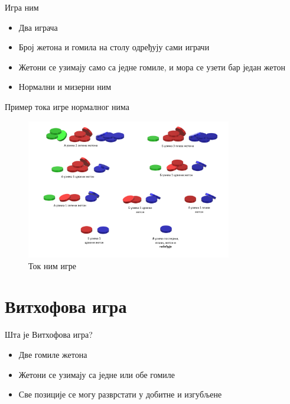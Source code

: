 \documentclass[10pt]{beamer}
\begin{document}
	\begin{frame}{Игра ним}
		\begin{itemize}
			\item Два играча
			\item Број жетона и гомила на столу одређују сами играчи
			\item Жетони се узимају само са једне гомиле, и мора се узети бар један жетон
			\item Нормални и мизерни ним
		\end{itemize}
	\end{frame}		
%
		
	\begin{frame}{Пример тока игре нормалног нима}
		\begin{figure}
	        \centering
	        \includegraphics[width=0.8\textwidth]{../src/statistics/picture/NimPrimer.png}
	        \caption{Ток ним игре}
	        \label{fig:nimprimer}
	    \end{figure}
	\end{frame}

\section{Витхофова игра}
	\begin{frame}{Шта је Витхофова игра?}
		
		\begin{itemize}
			\item Две гомиле жетона
			\item Жетони се узимају са једне или обе гомиле
			\item Све позиције се могу разврстати у добитне и изгубљене
		\end{itemize}
	\end{frame}
\end{document}
